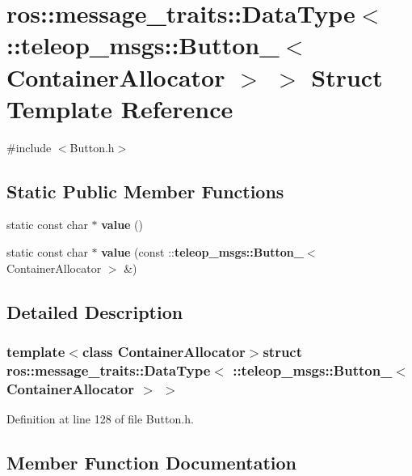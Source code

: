 \section{ros::message\_\-traits::DataType$<$ ::teleop\_\-msgs::Button\_\-$<$ ContainerAllocator $>$ $>$ Struct Template Reference}
\label{structros_1_1message__traits_1_1DataType_3_01_1_1teleop__msgs_1_1Button___3_01ContainerAllocator_01_4_01_4}


{\ttfamily \#include $<$Button.h$>$}

\subsection*{Static Public Member Functions}
\begin{DoxyCompactItemize}
\item 
static const char $\ast$ {\bf value} ()
\item 
static const char $\ast$ {\bf value} (const ::{\bf teleop\_\-msgs::Button\_\-}$<$ ContainerAllocator $>$ \&)
\end{DoxyCompactItemize}


\subsection{Detailed Description}
\subsubsection*{template$<$class ContainerAllocator$>$struct ros::message\_\-traits::DataType$<$ ::teleop\_\-msgs::Button\_\-$<$ ContainerAllocator $>$ $>$}



Definition at line 128 of file Button.h.



\subsection{Member Function Documentation}
